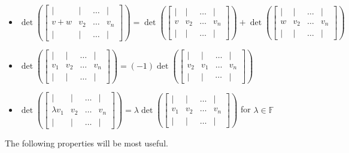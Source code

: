 \documentclass[12pt]{article}
\theoremstyle{definition}
\theoremstyle{remark}
\theoremstyle{plain}
\begin{document}
\begin{itemize}

	\item $ \det(\begin{bmatrix}
	\vert& \vert& \ldots & \vert\\
	v+w& v_2 &\ldots & v_n\\
	\vert& \vert& \ldots &\vert
\end{bmatrix}) = \det(\begin{bmatrix}
	\vert& \vert& \ldots &\vert\\
	v& v_2 &\ldots & v_n\\
	\vert& \vert& \ldots &\vert
\end{bmatrix}) +\det(\begin{bmatrix}
	\vert& \vert& \ldots &\vert\\
	w& v_2 &\ldots & v_n\\
	\vert& \vert& \ldots &\vert
\end{bmatrix}) $
\item$ \det(\begin{bmatrix}
	\vert &\vert &\ldots &\vert\\
	v_1& v_2 &\ldots & v_n\\
	\vert &\vert &\ldots &\vert
\end{bmatrix}) = (-1)\det(\begin{bmatrix}
	\vert&\vert & \ldots &\vert\\
	v_2& v_1 &\ldots & v_n\\
	\vert&\vert &\cdots &\vert
\end{bmatrix})
$
\item $ \det(\begin{bmatrix}
	\vert& \vert& \ldots & \vert\\
	\lambda v_1& v_2 & \ldots & v_n\\
	\vert& \vert& \ldots & \vert
\end{bmatrix}) = \lambda\det(\begin{bmatrix}
	\vert& \vert& \ldots & \vert\\
	v_1& v_2 & \ldots & v_n\\
	\vert& \vert& \ldots & \vert
\end{bmatrix})$ for $\lambda\in\mathbb{F}$

\end{itemize}
The following properties will be most useful.
\end{document}
